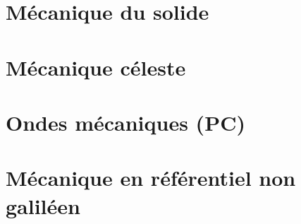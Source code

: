 \section{Mécanique du solide}


%


%

\section{Mécanique céleste}













\section{Ondes mécaniques (PC)}
%








\section{Mécanique en référentiel non galiléen}






